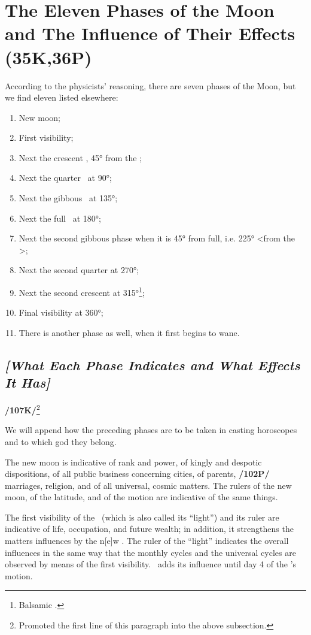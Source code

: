 \section{The Eleven Phases of the Moon and The Influence of Their Effects (35K,36P)}
According to the physicists’ reasoning, there are seven phases of the Moon, but we find eleven listed elsewhere:

\begin{enumerate}
\item New moon;
\item First visibility;
\item Next the crescent \Moon, 45° from the \Sun;
\item Next the quarter \Moon\, at 90°;
\item Next the gibbous \Moon\, at 135°;
\item Next the full \Moon\, at 180°;
\item Next the second gibbous phase when it is 45° from full, i.e. 225° <from the \Sun>;
\item Next the second quarter at 270°;
\item Next the second crescent at 315°\footnote{Balsamic \Moon.};
\item Final visibility at 360°;
\item There is another phase as well, when it first begins to wane.
\end{enumerate}

 \subsection{\textit{[What Each Phase Indicates and What Effects It Has]}}

\textbf{/107K/}\footnote{Promoted the first line of this paragraph into the above subsection.} 

We will append how the preceding phases are to be taken in casting horoscopes and to which god they belong.

The new moon is indicative of rank and power, of kingly and despotic dispositions, of all public business concerning cities, of parents, \textbf{/102P/} marriages, religion, and of all universal, cosmic matters. The rulers of the new moon, of the latitude, and of the motion are indicative of the same things. 

The first visibility of the \Moon\, (which is also called its “light”) and its ruler are indicative of life, occupation, and future wealth; in addition, it strengthens the matters influences by the n[e]w \Moon. The ruler of the “light” indicates the overall influences in the same way that the monthly cycles and the universal cycles are observed by means of the first visibility. \Mercury\, adds its influence until day 4 of the \Moon’s motion.

